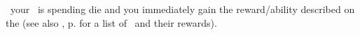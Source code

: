 \activating\ your \fortifications\ is spending die and you immediately gain the reward/ability described on the  \planetsheet (see also , p.\pageref{sec:fortifications} for a list of \fortifications\ and their rewards).
